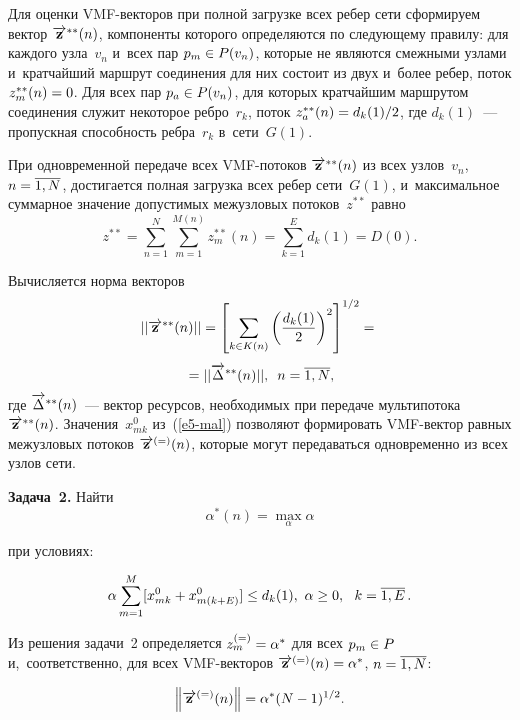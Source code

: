 \begin{multicols}{2}
\vspace*{-3pt}

\noindent
Для оценки VMF-векторов при полной загрузке всех ребер сети сформируем вектор  
$\overrightarrow{\mathbf{z}}^{**}(n)$, компоненты которого определяются по следующему 
правилу: для каждого узла~$v_n$  и~всех пар $p_m\hm \in P(v_n)$, которые не 
являются смежными узлами и~кратчайший маршрут соединения для них состоит из двух и~более ребер, поток $z^{**}_m(n) \hm= 0$. Для всех пар $p_a \hm\in P(v_n)$, для 
которых кратчайшим маршрутом соединения служит некоторое ребро~$r_k$, поток 
$z^{**}_a(n) \hm= d_k(1)/2$, где $d_k(1)$~--- пропускная способность ребра~$r_k$ в~сети~$G(1)$.

При одновременной передаче всех VMF-по\-то\-ков $\overrightarrow{\mathbf{z}}^{**}(n)$ из всех 
узлов~$v_n$, $n \hm= \ol{1, N}$, достигается полная загрузка всех ребер сети~$G(1)$, 
и~максимальное суммарное значение допустимых межузловых потоков~$z^{**}$ 
равно 
$$ 
z^{**} = \sum\limits_{n = 1}^N \sum_{m = 1}^{M(n)} z^{**}_m(n) = \sum\limits_{k = 1}^E 
d_k(1) = D(0). 
$$

Вычисляется норма векторов
\begin{multline*}
||\overrightarrow{\mathbf{z}}^{**}(n)|| = \left[\sum\limits_{k \in 
K(n)}\left(\displaystyle\frac{\displaystyle d_k(1)\mathstrut}{\displaystyle 2\mathstrut}\right)^2\right]^{1/2} = {}\\[4pt]
{}=  ||\overrightarrow\Delta^{**}(n)||,\enskip n  = \overline{1, N},
\end{multline*}
где $\overrightarrow\Delta^{**}(n)$~--- вектор ресурсов, необходимых при передаче 
мультипотока~$\overrightarrow{\mathbf{z}}^{**}(n)$.
Значения~$x_{mk}^0$ из~(\ref{e5-mal}) позволяют формировать VMF-век\-тор равных межузловых 
потоков $\overrightarrow{\mathbf{z}}^{(=)}(n)$, которые могут передаваться одновременно из 
всех узлов сети.

\smallskip

\noindent
\textbf{Задача~2.} Найти 
$$
\alpha^*(n) = \max\limits_{\alpha} \alpha
$$

\noindent
при условиях:

\noindent
$$  \alpha \sum\limits_{m=1}^M [ x_{mk}^0+  x_{m(k+E)}^0] \le 
d_k(1), \ \alpha \ge 0, \  \  k =\overline{1, E}\,.
$$

\smallskip

Из решения задачи~2 определяется $z_m^{(=)} \hm= \alpha^*$ для всех $p_m \hm\in P$ 
и,~соответственно, для всех VMF-век\-то\-ров $\ora{\mathbf{z}}^{(=)}(n) \hm= \alpha^*$, $n \hm= \ol{1, N}$:

\noindent
$$
\left\|\overrightarrow{\mathbf{z}}^{(=)}(n)\right\| = \alpha^*(N - 1)^{1/2}. $$


\end{multicols}
